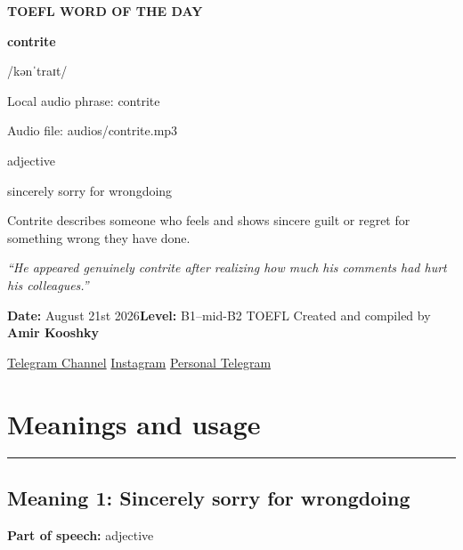 \documentclass[11pt]{article}
\newcommand{\sectionrule}{\par\vspace{-0.5em}\noindent\textcolor{Accent}{\rule{\linewidth}{0.6pt}}\par}
\begin{document}
\begin{center}
{\sffamily\bfseries\color{Accent} TOEFL WORD OF THE DAY\par}
\vspace{8mm}
{\fontsize{42}{48}\selectfont\bfseries contrite\par}
\vspace{2mm}
{\Large\sffamily\color{Accent} /kənˈtraɪt/\par}
\vspace{2mm}
{\small\sffamily Local audio phrase: contrite\par}
{\small\sffamily Audio file: audios/contrite.mp3\par}
\vspace{2mm}
{\large\sffamily\color{Muted} adjective\par}
\vspace{5mm}
{\sffamily sincerely sorry for wrongdoing\par}
\vspace{6mm}
{\large Contrite describes someone who feels and shows sincere guilt or regret for something wrong they have done.\par}
\vspace{6mm}
\begin{minipage}{0.84\textwidth}
\itshape “He appeared genuinely contrite after realizing how much his comments had hurt his colleagues.”
\end{minipage}\par
\vspace{10mm}
\textbf{Date:} August 21st 2026\quad\textbullet\quad \textbf{Level:} B1--mid-B2 TOEFL
\vfill
Created and compiled by \textbf{Amir Kooshky}\par
\vspace{2mm}
\href{https://t.me/KooshkyTOEFL}{Telegram Channel}\quad\textbullet\quad
\href{https://www.instagram.com/kooshkytoefl}{Instagram}\quad\textbullet\quad
\href{https://t.me/KooshkyTOEFL\_pv}{Personal Telegram}
\end{center}
\newpage
\tableofcontents
\newpage

\section{Meanings and usage}
\sectionrule
\subsection{Meaning 1: Sincerely sorry for wrongdoing}
\textbf{Part of speech:} adjective
\end{document}
